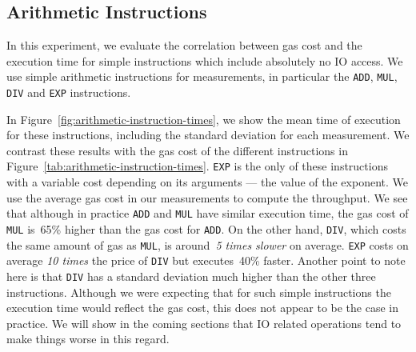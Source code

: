 \subsection{Arithmetic Instructions}
In this experiment, we evaluate the correlation between gas cost and the execution time for simple instructions which include absolutely no IO access. We use simple arithmetic instructions for measurements, in particular the \lstinline{ADD}, \lstinline{MUL}, \lstinline{DIV} and \lstinline{EXP} instructions.

In Figure~\ref{fig:arithmetic-instruction-times}, we show the mean time of execution for these instructions, including the standard deviation for each measurement. We contrast these results with the gas cost of the different instructions in Figure~\ref{tab:arithmetic-instruction-times}. \lstinline{EXP} is the only of these instructions with a variable cost depending on its arguments --- the value of the exponent. We use the average gas cost in our measurements to compute the throughput. We see that although in practice \lstinline{ADD} and \lstinline{MUL} have similar execution time, the gas cost of \lstinline{MUL} is~65\% higher than the gas cost for \lstinline{ADD}. On the other hand, \lstinline{DIV}, which costs the same amount of gas as \lstinline{MUL}, is around~\emph{5 times slower} on average. \lstinline{EXP} costs on average \emph{10 times} the price of \lstinline{DIV} but executes~40\% faster. Another point to note here is that \lstinline{DIV} has a standard deviation much higher than the other three instructions. Although we were expecting that for such simple instructions the execution time would reflect the gas cost, this does not appear to be the case in practice. We will show in the coming sections that IO related operations tend to make things worse in this regard.


